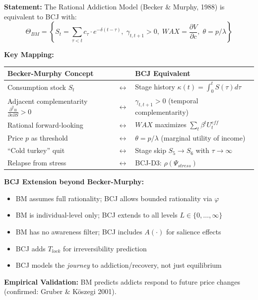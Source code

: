 \begin{tcolorbox}[colback=green!5!white, colframe=green!75!black,
    title=Theorem BCJ-T15: Becker-Murphy Rational Addiction as Special Case]
\textbf{Statement:} The Rational Addiction Model (Becker \& Murphy, 1988) is equivalent to BCJ with:
\begin{equation}
\Theta_{BM} = \left\{S_t = \sum_{\tau<t} c_\tau \cdot e^{-\delta(t-\tau)}, \; \gamma_{t,t+1} > 0, \; WAX = \frac{\partial V}{\partial c}, \; \theta = p/\lambda\right\}
\end{equation}

\textbf{Key Mapping:}
\begin{center}
\begin{tabular}{lcl}
\toprule
\textbf{Becker-Murphy Concept} & & \textbf{BCJ Equivalent} \\
\midrule
Consumption stock $S_t$ & $\leftrightarrow$ & Stage history $\kappa(t) = \int_0^t S(\tau)d\tau$ \\
Adjacent complementarity $\frac{\partial^2 u}{\partial c \partial S} > 0$ & $\leftrightarrow$ & $\gamma_{t,t+1} > 0$ (temporal complementarity) \\
Rational forward-looking & $\leftrightarrow$ & $WAX$ maximizes $\sum_{t} \beta^t U^{eff}_t$ \\
Price $p$ as threshold & $\leftrightarrow$ & $\theta = p / \lambda$ (marginal utility of income) \\
``Cold turkey'' quit & $\leftrightarrow$ & Stage skip $S_5 \to S_6$ with $\tau \to \infty$ \\
Relapse from stress & $\leftrightarrow$ & BCJ-D3: $\rho(\Psi_{stress})$ \\
\bottomrule
\end{tabular}
\end{center}

\textbf{BCJ Extension beyond Becker-Murphy:}
\begin{itemize}[nosep]
\item BM assumes full rationality; BCJ allows bounded rationality via $\varphi$
\item BM is individual-level only; BCJ extends to all levels $L \in \{0, \ldots, \infty\}$
\item BM has no awareness filter; BCJ includes $A(\cdot)$ for salience effects
\item BCJ adds $T_{lock}$ for irreversibility prediction
\item BCJ models the \textit{journey} to addiction/recovery, not just equilibrium
\end{itemize}

\textbf{Empirical Validation:} BM predicts addicts respond to future price changes (confirmed: Gruber \& Köszegi 2001).
\end{tcolorbox}


